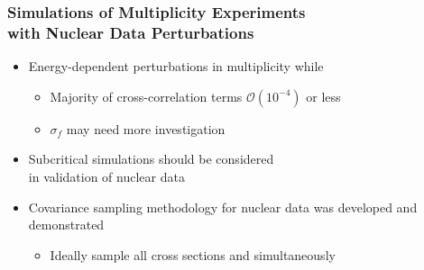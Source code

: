 \begin{frame}
\frametitle{Simulations of Multiplicity Experiments \\ with Nuclear Data Perturbations}
	\vspace{-0.2in}
\begin{itemize}
    \item[] Energy-dependent \nubar perturbations  in multiplicity while  \keff
      \begin{itemize}\vspace{0.1in}
		\item Majority of cross-correlation terms $\mathcal{O}(10^{-4})$ or less
            \vspace{-0.1in}
        \item $\sigma_f$ may need more investigation
            \\ 
	  \end{itemize}
      \item[] Subcritical simulations should be considered \\ in validation of nuclear data
      \item[] Covariance sampling methodology for nuclear data was developed and demonstrated
	\begin{itemize}
	 	\item Ideally sample all cross sections and \nubar simultaneously 

\end{itemize} 
\end{itemize}
\end{frame} 


\author{S.R. Bolding, \and C.J. Solomon}
\date{4 August 2016}
\begin{frame}
\vspace{-0.2in}
\centering
\maketitle

\end{frame} 






















